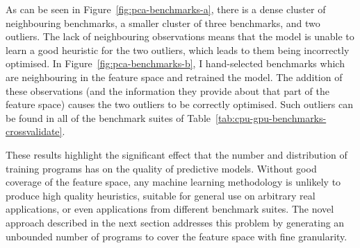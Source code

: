 As can be seen in Figure~\ref{fig:pca-benchmarks-a}, there is a dense cluster of neighbouring benchmarks, a smaller cluster of three benchmarks, and two outliers. The lack of neighbouring observations means that the model is unable to learn a good heuristic for the two outliers, which leads to them being incorrectly optimised. In Figure~\ref{fig:pca-benchmarks-b}, I hand-selected benchmarks which are neighbouring in the feature space and retrained the model. The addition of these observations (and the information they provide about that part of the feature space) causes the two outliers to be correctly optimised. Such outliers can be found in all of the benchmark suites of Table~\ref{tab:cpu-gpu-benchmarks-crossvalidate}.

These results highlight the significant effect that the number and distribution of training programs has on the quality of predictive models. Without good coverage of the feature space, any machine learning methodology is unlikely to produce high quality heuristics, suitable for general use on arbitrary real applications, or even applications from different benchmark suites. The novel approach described in the next section addresses this problem by generating an unbounded number of programs to cover the feature space with fine granularity.
